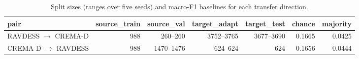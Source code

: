 \begin{table}[!t]
  \centering
  \caption{Split sizes (ranges over five seeds) and macro-F1 baselines for each transfer direction.}
  \label{tab:floors}
  \begin{tabular}{lrrrrrr}
    \toprule
    pair & source\_train & source\_val & target\_adapt & target\_test & chance & majority \\
    \midrule
    RAVDESS $\rightarrow$ CREMA-D & 988 & 260--260 & 3752--3765 & 3677--3690 & 0.1665 & 0.0425 \\
    CREMA-D $\rightarrow$ RAVDESS & 988 & 1470--1476 & 624--624 & 624 & 0.1656 & 0.0444 \\
    \bottomrule
  \end{tabular}
\end{table}
